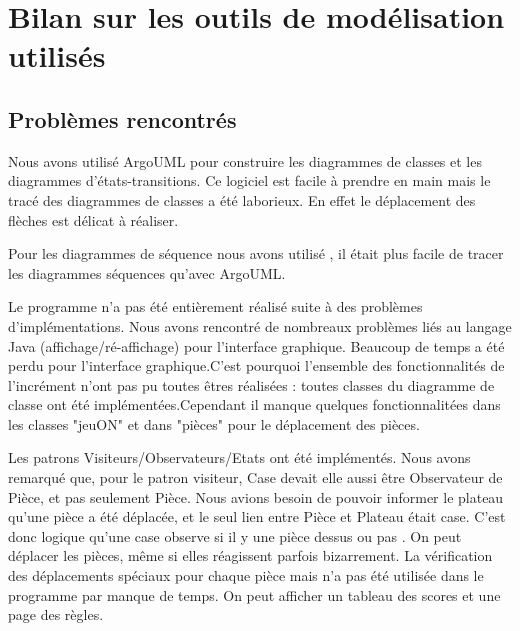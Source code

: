 \documentclass[11pt,a4paper]{report}
\begin{document}
\maketitle
\chapter*{Bilan sur les outils de modélisation utilisés}

\section*{Problèmes rencontrés}
Nous avons utilisé ArgoUML pour construire les diagrammes de classes et les diagrammes d'états-transitions. 
Ce logiciel est facile à prendre en main mais le tracé des diagrammes de classes a été laborieux. 
En effet le déplacement des flèches est délicat à réaliser.

Pour les diagrammes de séquence nous avons utilisé , il était plus facile de tracer les diagrammes séquences qu'avec ArgoUML.

Le programme n'a pas été entièrement réalisé suite à des problèmes d'implémentations. Nous avons rencontré de nombreaux problèmes liés
au langage Java (affichage/ré-affichage) pour l'interface graphique. Beaucoup de temps a été perdu pour l'interface
graphique.C'est pourquoi l'ensemble des fonctionnalités de l'incrément n'ont pas pu toutes êtres réalisées : toutes classes du diagramme de classe ont été implémentées.Cependant il manque quelques fonctionnalitées dans les classes "jeuON" et dans "pièces" pour le déplacement des pièces.

Les patrons Visiteurs/Observateurs/Etats ont été implémentés. Nous avons remarqué que, pour le patron visiteur, Case
devait elle aussi être Observateur de Pièce, et pas seulement Pièce. Nous avions besoin de pouvoir informer le plateau
qu'une pièce a été déplacée, et le seul lien entre Pièce et Plateau était case. C'est donc logique qu'une case
observe si il y une pièce dessus ou pas . On peut déplacer les pièces, même si elles réagissent parfois bizarrement. 
La vérification des déplacements spéciaux pour chaque pièce mais n'a pas été 
utilisée dans le programme par manque de temps.
On peut afficher un tableau des scores et une page des règles.
\end{document}
